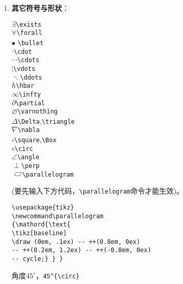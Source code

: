 \documentclass[fontset=windows]{article}
\newcommand{\q}{\quad}
\newcommand\parallelogram
{\mathord{\text{
\tikz[baseline] 
\draw (0em, .1ex)   -- ++(0.8em, 0ex) 
-- ++(0.2em, 1.2ex) -- ++(-0.8em, 0ex)
-- cycle;} } }
\begin{document}
\begin{multicols}{2}
\begin{enumerate}
\item \textbf{其它符号与形状}：
\vspace{-5mm}
\begin{multicols}{2} 
    $ \exists $\q \verb|\exists| \\
    $ \forall $\q \verb|\forall| \\    
    $ \bullet $ \q \verb|\bullet| \\
    $ \cdot $\q \verb|\cdot| \\
    $ \cdots $\q \verb|\cdots| \\
    $ \vdots $\q \verb|\vdots| \\
    $ \ddots $\q \verb|\ddots| \\
    $ \hbar $\q \verb|\hbar| \\
    $ \infty $\q \verb|\infty| \\
    $ \partial $\q \verb|\partial| \\
    $ \varnothing $\q \verb|\varnothing| \\
    $ \Delta $\q \verb|\Delta|,\verb|\triangle| \\
    $ \nabla $\q \verb|\nabla| \\
    $ \square $\q \verb|\square|,\verb|\Box|  \\
    $ \circ $\q \verb|\circ| \\
    $ \angle $\q \verb|\angle| \\
    $ \perp $\q \verb|\perp| \\   
    $ \parallelogram $\q \verb|\parallelogram|
\end{multicols} 
\vspace{-5mm} 
(要先输入下方代码，\verb|\parallelogram|命令才能生效)。
\begin{lstlisting}
\usepackage{tikz}
\newcommand\parallelogram
{\mathord{\text{
\tikz[baseline] 
\draw (0em, .1ex) -- ++(0.8em, 0ex) 
-- ++(0.2em, 1.2ex) -- ++(-0.8em, 0ex)
-- cycle;} } }
\end{lstlisting} 
角度$ 45^{\circ} $，\verb|45^{\circ}|


\end{enumerate}
\end{multicols}
\end{document}
